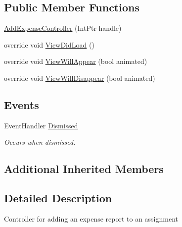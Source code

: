 \subsection*{Public Member Functions}
\begin{DoxyCompactItemize}
\item 
\hyperlink{class_field_service_1_1i_o_s_1_1_add_expense_controller_a985fa82e6e312189b23ffeff68dc2606}{Add\+Expense\+Controller} (Int\+Ptr handle)
\item 
override void \hyperlink{class_field_service_1_1i_o_s_1_1_add_expense_controller_a28b3e34f4b1ef564436ec0ceda9cdc0b}{View\+Did\+Load} ()
\item 
override void \hyperlink{class_field_service_1_1i_o_s_1_1_add_expense_controller_aadad8a1d44a3eccc5ce906ba69abe8fc}{View\+Will\+Appear} (bool animated)
\item 
override void \hyperlink{class_field_service_1_1i_o_s_1_1_add_expense_controller_ad3c94c407f06016951e38cc1a7af26da}{View\+Will\+Disappear} (bool animated)
\end{DoxyCompactItemize}
\subsection*{Events}
\begin{DoxyCompactItemize}
\item 
Event\+Handler \hyperlink{class_field_service_1_1i_o_s_1_1_add_expense_controller_abd627b481111903d98bd58cf9811a4a9}{Dismissed}
\begin{DoxyCompactList}\small\item\em Occurs when dismissed. \end{DoxyCompactList}\end{DoxyCompactItemize}
\subsection*{Additional Inherited Members}


\subsection{Detailed Description}
Controller for adding an expense report to an assignment 




